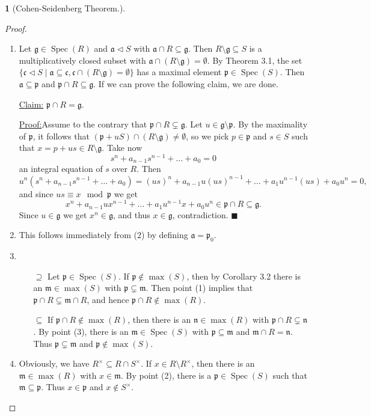 \documentclass[12pt,a4paper]{report}
\theoremstyle{definition}
\theoremstyle{num.custom-title}
\newtheorem{teo_custom-title}[theorem]{} %
\newenvironment{claim}[1]{\par\noindent\underline{Claim#1:}\space}{} %
\newenvironment{claimproof}[1]{\par\noindent\underline{Proof:}\space#1}{\leavevmode\unskip\penalty9999 \hbox{}\nobreak\hfill\quad\hbox{$\blacksquare$}} %
\DeclareMathOperator{\sm}{\setminus}
\DeclareMathOperator{\sse}{\subseteq}
\DeclareMathOperator{\Spec}{Spec}
\newcommand{\g}{\mathfrak{g}}
\newcommand{\p}{\mathfrak{p}}
\newcommand{\m}{\mathfrak{m}}
\begin{document}
\begin{teo_custom-title}[Cohen-Seidenberg Theorem.]
\begin{proof}
\begin{enumerate}
Then there is a $p \in \p$ such that
\[
a_0 = p - x(x^{n-1} + \ldots + a_1) \in \mathfrak{a} \cap R = \p \cap R \sse \p,
\]
hence $x(x^{n-1} + \ldots + a_1) \in \p$. By minimality $x^{n-1} + \ldots + a_1 \not\in \p$, whereby $x \in \p$.
\item Let $\g \in \Spec(R)$ and $\mathfrak{a} \lhd S$ with $\mathfrak{a} \cap R \sse \g$. Then $R \sm \g \sse S$ is a multiplicatively closed subset with $\mathfrak{a} \cap (R \sm \g) = \emptyset$. By Theorem 3.1, the set $\{ \mathfrak{c} \lhd S \mid \mathfrak{a} \sse \mathfrak{c}, \mathfrak{c} \cap (R \sm \g) = \emptyset \}$ has a maximal element $\p \in \Spec(S)$. Then $\mathfrak{a} \sse \p$ and $\p \cap R \sse \g$. If we can prove the following claim, we are done.
\begin{claim}{}
$\p \cap R = \g$.
\begin{claimproof}
Assume to the contrary that $\p \cap R \subsetneq \g$. Let $u \in \g \sm \p$. By the maximality of $\p$, it follows that $(\p + uS) \cap (R \sm \g) \neq \emptyset$, so we pick $p \in \p$ and $s \in S$ such that $x = p+us \in R \sm \g$. Take now
\[
s^n+a_{n-1}s^{n-1} + \ldots + a_0 = 0
\]
an integral equation of $s$ over $R$. Then
\[
u^n (s^n+a_{n-1}s^{n-1} + \ldots + a_0) = (us)^n + a_{n-1} u (us)^{n-1} + \ldots + a_1 u^{n-1} (us) + a_0 u^n = 0,
\]
and since $us \equiv x \mod \p$ we get
\[
x^n + a_{n-1} u x^{n-1} + \ldots + a_1 u^{n-1} x + a_0 u^n \in \p \cap R \sse \g.
\]
Since $u \in \g$ we get $x^n \in \g$, and thus $x \in \g$, contradiction.
\end{claimproof}
\end{claim}
\item This follows immediately from (2) by defining $\mathfrak{a} = \p_0$.
\item 
\begin{itemize}
\item[$\supseteq$] Let $\p \in \Spec(S)$. If $\p \not\in \max(S)$, then by Corollary 3.2 there is an $\m \in \max(S)$ with $\p \subsetneq \m$. Then point (1) implies that $\p \cap R \subsetneq \m \cap R$, and hence $\p \cap R \not\in \max(R)$.
\item[$\sse$] If $\p \cap R \not\in \max(R)$, then there is an $\mathfrak{n} \in \max(R)$ with $\p \cap R \subsetneq \mathfrak{n}$. By point (3), there is an $\m \in \Spec(S)$ with $\p \sse \m$ and $\m \cap R = \mathfrak{n}$. Thus $\p \subsetneq \m$ and $\p \not\in \max(S)$.
\end{itemize}
\item Obviously, we have $R^\times \sse R \cap S^\times$. If $x \in R \sm R^\times$, then there is an $\m \in \max(R)$ with $x \in \m$. By point (2), there is a $\p \in \Spec(S)$ such that $\m \sse \p$. Thus $x \in \p$ and $x \not\in S^\times$.\\

\end{enumerate}
\end{proof}
\end{teo_custom-title}
\end{document}
